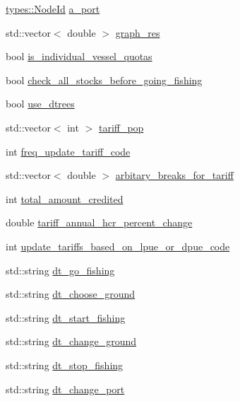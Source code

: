 \begin{DoxyCompactItemize}
\mbox{\hyperlink{classtypes_1_1_node_id}{types\+::\+Node\+Id}} \mbox{\hyperlink{structdisplace_1_1commons_1_1_scenario_a401114b7c883de423af76e4fd3834f1a}{a\+\_\+port}}
\item 
std\+::vector$<$ double $>$ \mbox{\hyperlink{structdisplace_1_1commons_1_1_scenario_a0e8ba37dbf8036d8d7b6067379b1f3dd}{graph\+\_\+res}}
\item 
bool \mbox{\hyperlink{structdisplace_1_1commons_1_1_scenario_a960326e0a8622a534ede2ba63b11f126}{is\+\_\+individual\+\_\+vessel\+\_\+quotas}}
\item 
bool \mbox{\hyperlink{structdisplace_1_1commons_1_1_scenario_a89bf74bd52fcdb9b0a6408ff7e94845d}{check\+\_\+all\+\_\+stocks\+\_\+before\+\_\+going\+\_\+fishing}}
\item 
bool \mbox{\hyperlink{structdisplace_1_1commons_1_1_scenario_acb16e14e5eb111de421a5dfd10376046}{use\+\_\+dtrees}}
\item 
std\+::vector$<$ int $>$ \mbox{\hyperlink{structdisplace_1_1commons_1_1_scenario_a781f523b4098519c411acd00c24c9bd1}{tariff\+\_\+pop}}
\item 
int \mbox{\hyperlink{structdisplace_1_1commons_1_1_scenario_a16949dd987bb161a749ac5d8dc523383}{freq\+\_\+update\+\_\+tariff\+\_\+code}}
\item 
std\+::vector$<$ double $>$ \mbox{\hyperlink{structdisplace_1_1commons_1_1_scenario_a4cac61d9c381dcf51bd24f9d060be1bb}{arbitary\+\_\+breaks\+\_\+for\+\_\+tariff}}
\item 
int \mbox{\hyperlink{structdisplace_1_1commons_1_1_scenario_a5834c76761e64aaa747fb202b9dbb2e4}{total\+\_\+amount\+\_\+credited}}
\item 
double \mbox{\hyperlink{structdisplace_1_1commons_1_1_scenario_a474dac68291e01505ada79286272398f}{tariff\+\_\+annual\+\_\+hcr\+\_\+percent\+\_\+change}}
\item 
int \mbox{\hyperlink{structdisplace_1_1commons_1_1_scenario_a3c598ca2ae81853fce456ffbfc986ff8}{update\+\_\+tariffs\+\_\+based\+\_\+on\+\_\+lpue\+\_\+or\+\_\+dpue\+\_\+code}}
\item 
std\+::string \mbox{\hyperlink{structdisplace_1_1commons_1_1_scenario_afe59c60471f7657fea1210aebfd9398e}{dt\+\_\+go\+\_\+fishing}}
\item 
std\+::string \mbox{\hyperlink{structdisplace_1_1commons_1_1_scenario_a2c208cf776046bdb62107f25f0f3d197}{dt\+\_\+choose\+\_\+ground}}
\item 
std\+::string \mbox{\hyperlink{structdisplace_1_1commons_1_1_scenario_a965ac04278a75f523d846512b7a904b1}{dt\+\_\+start\+\_\+fishing}}
\item 
std\+::string \mbox{\hyperlink{structdisplace_1_1commons_1_1_scenario_a8315737d6ba55b122d9fbde4947b5618}{dt\+\_\+change\+\_\+ground}}
\item 
std\+::string \mbox{\hyperlink{structdisplace_1_1commons_1_1_scenario_a2220aa404a45dd9fbaf355712c104c88}{dt\+\_\+stop\+\_\+fishing}}
\item 
std\+::string \mbox{\hyperlink{structdisplace_1_1commons_1_1_scenario_a067b9e6833b5187a391aca6e8f560062}{dt\+\_\+change\+\_\+port}}
\end{DoxyCompactItemize}
